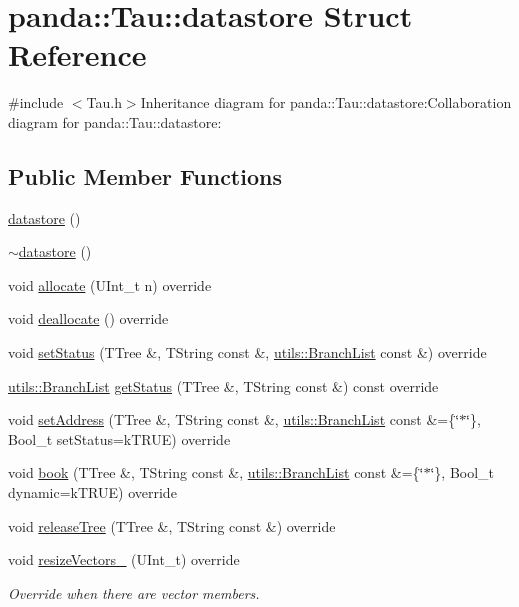 \hypertarget{structpanda_1_1Tau_1_1datastore}{
\section{panda::Tau::datastore Struct Reference}
\label{structpanda_1_1Tau_1_1datastore}
}


{\ttfamily \#include $<$Tau.h$>$}Inheritance diagram for panda::Tau::datastore:Collaboration diagram for panda::Tau::datastore:\subsection*{Public Member Functions}
\begin{DoxyCompactItemize}
\item 
\hyperlink{structpanda_1_1Tau_1_1datastore_a48102b990097fe44c912c4a155786846}{datastore} ()
\item 
\hyperlink{structpanda_1_1Tau_1_1datastore_a1cacb9f88f221d242a5e80ba7959c27b}{$\sim$datastore} ()
\item 
void \hyperlink{structpanda_1_1Tau_1_1datastore_a6f817076ea4ed71fc8b66c70a834b39d}{allocate} (UInt\_\-t n) override
\item 
void \hyperlink{structpanda_1_1Tau_1_1datastore_af651d3ae362a4a6d99b1bff788accca3}{deallocate} () override
\item 
void \hyperlink{structpanda_1_1Tau_1_1datastore_a528e0b260c39c11862f8631cf9e1743e}{setStatus} (TTree \&, TString const \&, \hyperlink{classpanda_1_1utils_1_1BranchList}{utils::BranchList} const \&) override
\item 
\hyperlink{classpanda_1_1utils_1_1BranchList}{utils::BranchList} \hyperlink{structpanda_1_1Tau_1_1datastore_af6634c2974f07bafef20c5a49dfd4050}{getStatus} (TTree \&, TString const \&) const override
\item 
void \hyperlink{structpanda_1_1Tau_1_1datastore_a4cbb512cb1da538b968aa7bfea700f2b}{setAddress} (TTree \&, TString const \&, \hyperlink{classpanda_1_1utils_1_1BranchList}{utils::BranchList} const \&=\{\char`\"{}$\ast$\char`\"{}\}, Bool\_\-t setStatus=kTRUE) override
\item 
void \hyperlink{structpanda_1_1Tau_1_1datastore_a835217578e10605f669fd448a0e6531c}{book} (TTree \&, TString const \&, \hyperlink{classpanda_1_1utils_1_1BranchList}{utils::BranchList} const \&=\{\char`\"{}$\ast$\char`\"{}\}, Bool\_\-t dynamic=kTRUE) override
\item 
void \hyperlink{structpanda_1_1Tau_1_1datastore_ad3b1c3b063d8091225a37315a6dfb998}{releaseTree} (TTree \&, TString const \&) override
\item 
void \hyperlink{structpanda_1_1Tau_1_1datastore_a1dce455474842a78eb6a7ab7b3271f3a}{resizeVectors\_\-} (UInt\_\-t) override
\begin{DoxyCompactList}\small\item\em Override when there are vector members. \item\end{DoxyCompactList}\end{DoxyCompactItemize}


